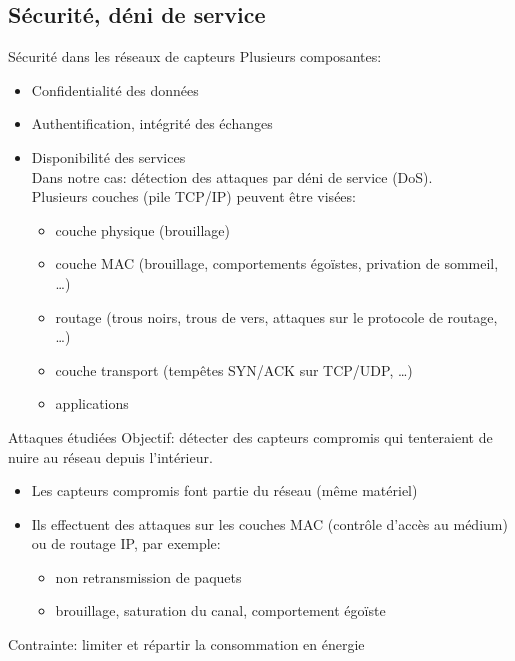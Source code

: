 \documentclass[aspectratio=43]{beamer} %
\begin{document}
\subsection[Sécurité]{Sécurité, déni de service}
\begin{frame}{Sécurité dans les réseaux de capteurs}
  Plusieurs composantes:
  \begin{small}
    \begin{itemize}
      \item Confidentialité des données
      \item Authentification, intégrité des échanges
      \item \alert{Disponibilité} des services\\
        Dans notre cas: détection des attaques par \alert{déni de service} (DoS).\\
        Plusieurs couches (pile TCP/IP) peuvent être visées:\\
        \begin{itemize}
            \footnotesize
          \item couche physique (brouillage)
          \item \alert{couche MAC} (brouillage, comportements égoïstes, privation de sommeil, \dots)
          \item \alert{routage} (trous noirs, trous de vers, attaques sur le protocole de routage, \dots)
          \item couche transport (tempêtes SYN/ACK sur TCP/UDP, \dots)
          \item applications
        \end{itemize}
    \end{itemize}
  \end{small}
\end{frame}
\begin{frame}{Attaques étudiées}
  Objectif: détecter des \alert{capteurs compromis} qui tenteraient de nuire au réseau depuis l'intérieur.
  \begin{itemize}
    \item Les capteurs compromis font partie du réseau (même matériel)
    \item Ils effectuent des attaques sur les couches MAC (contrôle d'accès au médium) ou de routage IP, par exemple:
      \begin{itemize}
        \item non retransmission de paquets
        \item brouillage, saturation du canal, comportement égoïste
      \end{itemize}
  \end{itemize}
  \medskip
  Contrainte: \alert{limiter} et \alert{répartir} la consommation en énergie
\end{frame}
\end{document}
